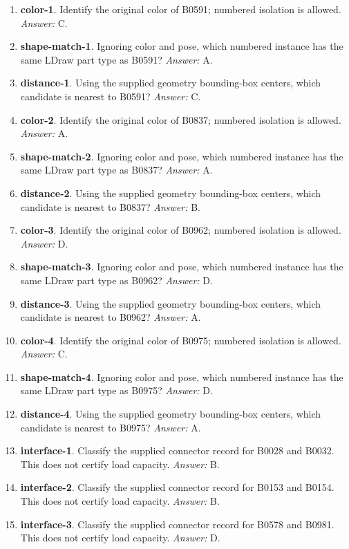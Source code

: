\begin{enumerate}
\item \textbf{color-1}. Identify the original color of B0591; numbered isolation is allowed. \textit{Answer:} C.
\item \textbf{shape-match-1}. Ignoring color and pose, which numbered instance has the same LDraw part type as B0591? \textit{Answer:} A.
\item \textbf{distance-1}. Using the supplied geometry bounding-box centers, which candidate is nearest to B0591? \textit{Answer:} C.
\item \textbf{color-2}. Identify the original color of B0837; numbered isolation is allowed. \textit{Answer:} A.
\item \textbf{shape-match-2}. Ignoring color and pose, which numbered instance has the same LDraw part type as B0837? \textit{Answer:} A.
\item \textbf{distance-2}. Using the supplied geometry bounding-box centers, which candidate is nearest to B0837? \textit{Answer:} B.
\item \textbf{color-3}. Identify the original color of B0962; numbered isolation is allowed. \textit{Answer:} D.
\item \textbf{shape-match-3}. Ignoring color and pose, which numbered instance has the same LDraw part type as B0962? \textit{Answer:} D.
\item \textbf{distance-3}. Using the supplied geometry bounding-box centers, which candidate is nearest to B0962? \textit{Answer:} A.
\item \textbf{color-4}. Identify the original color of B0975; numbered isolation is allowed. \textit{Answer:} C.
\item \textbf{shape-match-4}. Ignoring color and pose, which numbered instance has the same LDraw part type as B0975? \textit{Answer:} D.
\item \textbf{distance-4}. Using the supplied geometry bounding-box centers, which candidate is nearest to B0975? \textit{Answer:} A.
\item \textbf{interface-1}. Classify the supplied connector record for B0028 and B0032. This does not certify load capacity. \textit{Answer:} B.
\item \textbf{interface-2}. Classify the supplied connector record for B0153 and B0154. This does not certify load capacity. \textit{Answer:} B.
\item \textbf{interface-3}. Classify the supplied connector record for B0578 and B0981. This does not certify load capacity. \textit{Answer:} D.

\end{enumerate}
